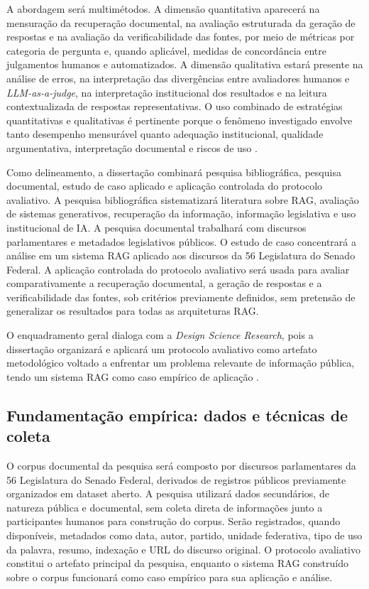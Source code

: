 A abordagem será multimétodos. A dimensão quantitativa aparecerá na mensuração da recuperação documental, na avaliação estruturada da geração de respostas e na avaliação da verificabilidade das fontes, por meio de métricas por categoria de pergunta e, quando aplicável, medidas de concordância entre julgamentos humanos e automatizados. A dimensão qualitativa estará presente na análise de erros, na interpretação das divergências entre avaliadores humanos e \textit{LLM-as-a-judge}, na interpretação institucional dos resultados e na leitura contextualizada de respostas representativas. O uso combinado de estratégias quantitativas e qualitativas é pertinente porque o fenômeno investigado envolve tanto desempenho mensurável quanto adequação institucional, qualidade argumentativa, interpretação documental e riscos de uso \parencite{creswellPlanoClark2018mixedMethods}.

Como delineamento, a dissertação combinará pesquisa bibliográfica, pesquisa documental, estudo de caso aplicado e aplicação controlada do protocolo avaliativo. A pesquisa bibliográfica sistematizará literatura sobre RAG, avaliação de sistemas generativos, recuperação da informação, informação legislativa e uso institucional de IA. A pesquisa documental trabalhará com discursos parlamentares e metadados legislativos públicos. O estudo de caso concentrará a análise em um sistema RAG aplicado aos discursos da 56\textordfeminine{} Legislatura do Senado Federal. A aplicação controlada do protocolo avaliativo será usada para avaliar comparativamente a recuperação documental, a geração de respostas e a verificabilidade das fontes, sob critérios previamente definidos, sem pretensão de generalizar os resultados para todas as arquiteturas RAG.

O enquadramento geral dialoga com a \textit{Design Science Research}, pois a dissertação organizará e aplicará um protocolo avaliativo como artefato metodológico voltado a enfrentar um problema relevante de informação pública, tendo um sistema RAG como caso empírico de aplicação \parencite{hevnerEtAl2004designScience,peffersEtAl2007dsrm}.

\subsection{Fundamentação empírica: dados e técnicas de coleta}

O corpus documental da pesquisa será composto por discursos parlamentares da 56\textordfeminine{} Legislatura do Senado Federal, derivados de registros públicos previamente organizados em dataset aberto. A pesquisa utilizará dados secundários, de natureza pública e documental, sem coleta direta de informações junto a participantes humanos para construção do corpus. Serão registrados, quando disponíveis, metadados como data, autor, partido, unidade federativa, tipo de uso da palavra, resumo, indexação e URL do discurso original. O protocolo avaliativo constitui o artefato principal da pesquisa, enquanto o sistema RAG construído sobre o corpus funcionará como caso empírico para sua aplicação e análise.

